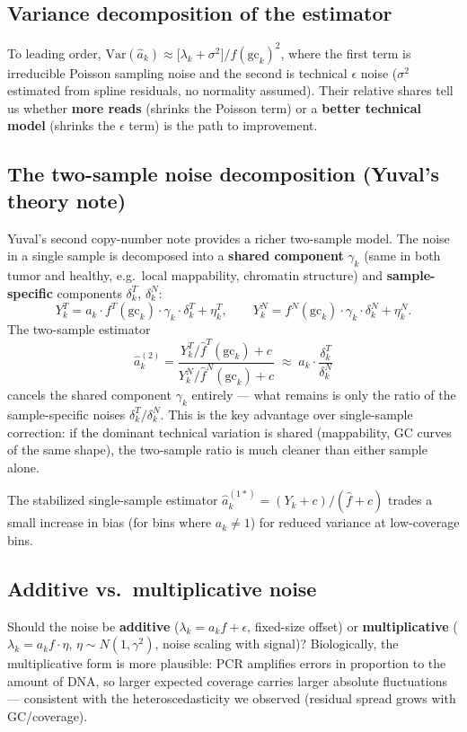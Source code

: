 \documentclass[11pt]{article}
\begin{document}
\subsection{Variance decomposition of the estimator}

To leading order,
$\mathrm{Var}(\hat a_k) \approx \bigl[\lambda_k + \sigma^2\bigr]/f(\text{gc}_k)^2$,
where the first term is irreducible Poisson sampling noise and the second is technical
$\epsilon$ noise ($\sigma^2$ estimated from spline residuals, no normality assumed).
Their relative shares tell us whether \textbf{more reads} (shrinks the Poisson term)
or a \textbf{better technical model} (shrinks the $\epsilon$ term) is the path to
improvement.

\subsection{The two-sample noise decomposition (Yuval's theory note)}

Yuval's second copy-number note provides a richer two-sample model. The noise in a single
sample is decomposed into a \textbf{shared component} $\gamma_k$ (same in both tumor and
healthy, e.g.\ local mappability, chromatin structure) and \textbf{sample-specific} components
$\delta_k^T$, $\delta_k^N$:
\[
  Y_k^T = a_k \cdot f^T(\text{gc}_k) \cdot \gamma_k \cdot \delta_k^T + \eta^T_{k},\qquad
  Y_k^N = f^N(\text{gc}_k) \cdot \gamma_k \cdot \delta_k^N + \eta^N_{k} .
\]
The two-sample estimator
\[
  \hat a_k^{(2)} = \frac{Y_k^T / \hat f^T(\text{gc}_k) + c}{Y_k^N / \hat f^N(\text{gc}_k) + c}
  \;\approx\; a_k \cdot \frac{\delta_k^T}{\delta_k^N}
\]
cancels the shared component $\gamma_k$ entirely --- what remains is only the ratio of the
sample-specific noises $\delta_k^T/\delta_k^N$. This is the key advantage over single-sample
correction: if the dominant technical variation is shared (mappability, GC curves of the same shape), the two-sample ratio is much cleaner than either sample alone.

The stabilized single-sample estimator $\hat a_k^{(1*)} = (Y_k+c)/(\hat f + c)$ trades a small
increase in bias (for bins where $a_k\neq 1$) for reduced variance at low-coverage bins.

\subsection{Additive vs.\ multiplicative noise}

Should the noise be \textbf{additive} ($\lambda_k = a_k f + \epsilon$, fixed-size
offset) or \textbf{multiplicative} ($\lambda_k = a_k f \cdot \eta$,
$\eta\sim N(1,\gamma^2)$, noise scaling with signal)? Biologically, the multiplicative
form is more plausible: PCR amplifies errors in proportion to the amount of DNA, so
larger expected coverage carries larger absolute fluctuations --- consistent with the
heteroscedasticity we observed (residual spread grows with GC/coverage).
\end{document}
